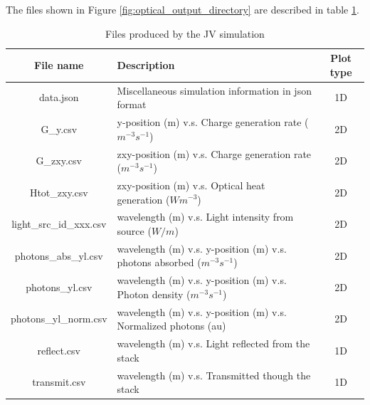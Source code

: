 The files shown in Figure \ref{fig:optical_output_directory} are described in table \ref{tab:optical_output_files}.

\begin{table}[H]
\begin{center}
\begin{tabular}{ |c|l|c| } 
 \hline
	File name 				& 	Description  & Plot type\\ 
 \hline
	data.json				&	Miscellaneous simulation information in json format			&	1D \\
 	G\_y.csv				&	y-position (m) v.s. Charge generation rate ($m^{-3} s^{-1}$)&	2D \\
	G\_zxy.csv				&	zxy-position (m) v.s. Charge generation rate ($m^{-3} s^{-1}$)	&	2D \\
 	Htot\_zxy.csv			&	zxy-position (m) v.s. Optical heat generation ($W m^{-3}$)	&	2D \\
 	light\_src\_id\_xxx.csv	&	wavelength (m) v.s. Light intensity from source ($W/m$)		&	2D \\
 	photons\_abs\_yl.csv	&	wavelength (m) v.s. y-position (m) v.s. photons absorbed ($m^{-3} s^{-1}$)	&	2D \\
 	photons\_yl.csv			&	wavelength (m) v.s. y-position (m) v.s. Photon density ($m^{-3} s^{-1}$)&	2D\\
 	photons\_yl\_norm.csv	&	wavelength (m) v.s. y-position (m) v.s. Normalized photons (au)&	2D \\
 	reflect.csv				&	wavelength (m) v.s. Light reflected from the stack 	&	1D  \\
 	transmit.csv			&	wavelength (m) v.s. Transmitted though the stack	&	1D  \\
 \hline
\end{tabular}
\caption{Files produced by the JV simulation}
\label{tab:optical_output_files}
\end{center}
\end{table}

\newpage


